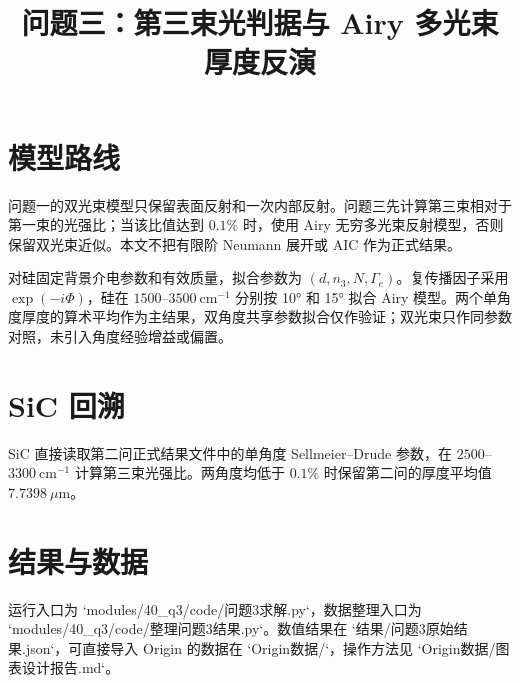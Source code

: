 \documentclass[UTF8]{ctexart}
\title{问题三：第三束光判据与 Airy 多光束厚度反演}
\begin{document}
\maketitle

\section{模型路线}
问题一的双光束模型只保留表面反射和一次内部反射。问题三先计算第三束相对于第一束的光强比；当该比值达到 $0.1\%$ 时，使用 Airy 无穷多光束反射模型，否则保留双光束近似。本文不把有限阶 Neumann 展开或 AIC 作为正式结果。

对硅固定背景介电参数和有效质量，拟合参数为 $(d,n_3,N,\Gamma_e)$。复传播因子采用 $\exp(-i\Phi)$，硅在 $1500$--$3500\ \mathrm{cm^{-1}}$ 分别按 10° 和 15° 拟合 Airy 模型。两个单角度厚度的算术平均作为主结果，双角度共享参数拟合仅作验证；双光束只作同参数对照，未引入角度经验增益或偏置。

\section{SiC 回溯}
SiC 直接读取第二问正式结果文件中的单角度 Sellmeier--Drude 参数，在 $2500$--$3300\ \mathrm{cm^{-1}}$ 计算第三束光强比。两角度均低于 $0.1\%$ 时保留第二问的厚度平均值 $7.7398\ \mu\mathrm m$。

\section{结果与数据}
运行入口为 `modules/40_q3/code/问题3求解.py`，数据整理入口为 `modules/40_q3/code/整理问题3结果.py`。数值结果在 `结果/问题3原始结果.json`，可直接导入 Origin 的数据在 `Origin数据/`，操作方法见 `Origin数据/图表设计报告.md`。
\end{document}
